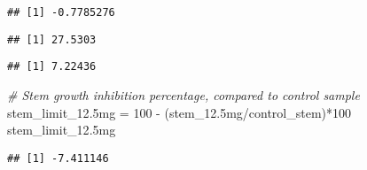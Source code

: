 \documentclass[
]{article}
\newenvironment{Shaded}{\begin{snugshade}}{\end{snugshade}}
\newcommand{\CommentTok}[1]{\textcolor[rgb]{0.56,0.35,0.01}{\textit{#1}}}
\newcommand{\DecValTok}[1]{\textcolor[rgb]{0.00,0.00,0.81}{#1}}
\newcommand{\FloatTok}[1]{\textcolor[rgb]{0.00,0.00,0.81}{#1}}
\newcommand{\FunctionTok}[1]{\textcolor[rgb]{0.00,0.00,0.00}{#1}}
\newcommand{\NormalTok}[1]{#1}
\newcommand{\OtherTok}[1]{\textcolor[rgb]{0.56,0.35,0.01}{#1}}
\newcommand{\SpecialCharTok}[1]{\textcolor[rgb]{0.00,0.00,0.00}{#1}}
\begin{document}
\begin{verbatim}
## [1] -0.7785276
\end{verbatim}

\begin{Shaded}
\end{Shaded}

\begin{verbatim}
## [1] 27.5303
\end{verbatim}

\begin{Shaded}
\end{Shaded}

\begin{verbatim}
## [1] 7.22436
\end{verbatim}

\begin{Shaded}
\begin{Highlighting}[]
\CommentTok{\# Stem growth inhibition percentage, compared to control sample}
\NormalTok{stem\_limit\_12}\FloatTok{.5}\NormalTok{mg }\OtherTok{=} \DecValTok{100} \SpecialCharTok{{-}}\NormalTok{ (stem\_12}\FloatTok{.5}\NormalTok{mg}\SpecialCharTok{/}\NormalTok{control\_stem)}\SpecialCharTok{*}\DecValTok{100}
\NormalTok{stem\_limit\_12}\FloatTok{.5}\NormalTok{mg}
\end{Highlighting}
\end{Shaded}

\begin{verbatim}
## [1] -7.411146
\end{verbatim}

\begin{Shaded}
\end{Shaded}
\end{document}
